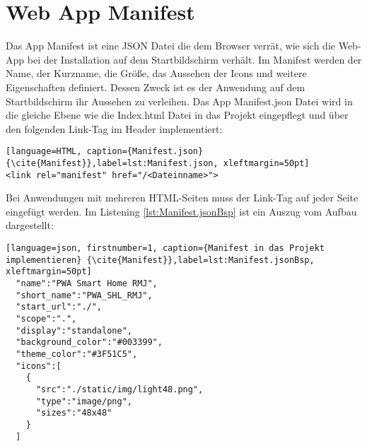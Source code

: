 \section{Web App Manifest}\label{sub:Manifest}
Das App Manifest ist eine JSON Datei die dem Browser verrät, wie sich die \acs{Web-App} bei der Installation auf dem Startbildschirm verhält. Im Manifest werden der Name, der Kurzname, die Größe, das Aussehen der Icons und weitere Eigenschaften definiert. Dessen Zweck ist es der Anwendung auf dem Startbildschirm ihr Aussehen zu verleihen. 
Das App Manifest.json Datei wird in die gleiche Ebene wie die Index.html Datei in das Projekt eingepflegt und über den folgenden Link-Tag im Header implementiert: 

\begin{lstlisting}[language=HTML, caption={Manifest.json} {\cite{Manifest}},label=lst:Manifest.json, xleftmargin=50pt]
<link rel="manifest" href="/<Dateinname>">
\end{lstlisting}

Bei Anwendungen mit mehreren \acs{HTML}-Seiten muss der Link-Tag auf jeder Seite eingefügt werden. 
Im Listening \ref{lst:Manifest.jsonBsp} ist ein Auszug vom Aufbau dargestellt:
	\begin{lstlisting}[language=json, firstnumber=1, caption={Manifest in das Projekt implementieren} {\cite{Manifest}},label=lst:Manifest.jsonBsp, xleftmargin=50pt]
  "name":"PWA Smart Home RMJ",
  "short_name":"PWA_SHL_RMJ",
  "start_url":"./",
  "scope":".",
  "display":"standalone",
  "background_color":"#003399",
  "theme_color":"#3F51C5",
  "icons":[
    {
      "src":"./static/img/light48.png",
      "type":"image/png",
      "sizes":"48x48"
    }
  ]

\end{lstlisting}










